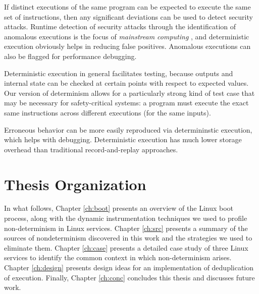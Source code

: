 If distinct executions of the same program can be
expected to execute the same set of instructions, then
any significant deviations can be used to detect security
attacks. Runtime detection of security attacks through the
identification of anomalous executions is the focus of \emph{mainstream computing} \cite{stephenson2010mainstream},
and deterministic execution obviously helps in reducing false
positives. 
Anomalous executions can also be flagged for performance
debugging. \newline

Deterministic execution in general facilitates testing,
because outputs and internal state can be checked at 
certain points with respect to expected values. Our version
of determinism allows for a particularly strong kind
of test case that may be necessary for safety-critical 
systems: a program 
must execute the exact same instructions 
across different executions (for the same inputs). \newline 

Erroneous behavior can be more easily reproduced
via determininstic execution, which
helps with debugging. Deterministic
execution has much lower storage overhead
than traditional record-and-replay approaches. 

\section{Thesis Organization} 
In what follows, Chapter \ref{ch:boot} presents an overview of
the Linux boot process, along with the dynamic instrumentation
techniques we used to profile non-determinism in Linux services.
Chapter \ref{ch:src} presents a summary of the sources of nondeterminism
discovered in this work and the strategies we used
to eliminate them. 
Chapter \ref{ch:case} presents a detailed case study of three Linux services
to identify the common context in which non-determinism arises.
Chapter \ref{ch:design} presents design ideas for an implementation of deduplication of execution.
Finally, Chapter \ref{ch:conc} concludes this thesis and discusses future work.
